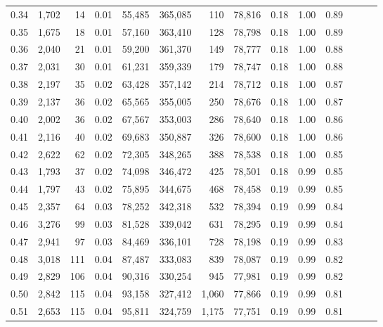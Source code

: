 \begin{tabular}{rrrrrrrrrrrrrr}
0.34 &   1,702 &     14 &  0.01 &   55,485 &  365,085 &     110 &  78,816 &  0.18 &  1.00 &      0.89 \\
0.35 &   1,675 &     18 &  0.01 &   57,160 &  363,410 &     128 &  78,798 &  0.18 &  1.00 &      0.89 \\
0.36 &   2,040 &     21 &  0.01 &   59,200 &  361,370 &     149 &  78,777 &  0.18 &  1.00 &      0.88 \\
0.37 &   2,031 &     30 &  0.01 &   61,231 &  359,339 &     179 &  78,747 &  0.18 &  1.00 &      0.88 \\
0.38 &   2,197 &     35 &  0.02 &   63,428 &  357,142 &     214 &  78,712 &  0.18 &  1.00 &      0.87 \\
0.39 &   2,137 &     36 &  0.02 &   65,565 &  355,005 &     250 &  78,676 &  0.18 &  1.00 &      0.87 \\
0.40 &   2,002 &     36 &  0.02 &   67,567 &  353,003 &     286 &  78,640 &  0.18 &  1.00 &      0.86 \\
0.41 &   2,116 &     40 &  0.02 &   69,683 &  350,887 &     326 &  78,600 &  0.18 &  1.00 &      0.86 \\
0.42 &   2,622 &     62 &  0.02 &   72,305 &  348,265 &     388 &  78,538 &  0.18 &  1.00 &      0.85 \\
0.43 &   1,793 &     37 &  0.02 &   74,098 &  346,472 &     425 &  78,501 &  0.18 &  0.99 &      0.85 \\
0.44 &   1,797 &     43 &  0.02 &   75,895 &  344,675 &     468 &  78,458 &  0.19 &  0.99 &      0.85 \\
0.45 &   2,357 &     64 &  0.03 &   78,252 &  342,318 &     532 &  78,394 &  0.19 &  0.99 &      0.84 \\
0.46 &   3,276 &     99 &  0.03 &   81,528 &  339,042 &     631 &  78,295 &  0.19 &  0.99 &      0.84 \\
0.47 &   2,941 &     97 &  0.03 &   84,469 &  336,101 &     728 &  78,198 &  0.19 &  0.99 &      0.83 \\
0.48 &   3,018 &    111 &  0.04 &   87,487 &  333,083 &     839 &  78,087 &  0.19 &  0.99 &      0.82 \\
0.49 &   2,829 &    106 &  0.04 &   90,316 &  330,254 &     945 &  77,981 &  0.19 &  0.99 &      0.82 \\
0.50 &   2,842 &    115 &  0.04 &   93,158 &  327,412 &   1,060 &  77,866 &  0.19 &  0.99 &      0.81 \\
0.51 &   2,653 &    115 &  0.04 &   95,811 &  324,759 &   1,175 &  77,751 &  0.19 &  0.99 &      0.81 \\

\end{tabular}
